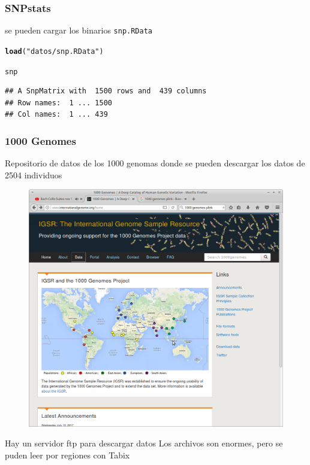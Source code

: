 \documentclass{beamer}\usepackage[]{graphicx}\usepackage[]{color}
\makeatletter
\newcommand{\hlstr}[1]{\textcolor[rgb]{0.192,0.494,0.8}{#1}}%
\newcommand{\hlstd}[1]{\textcolor[rgb]{0.345,0.345,0.345}{#1}}%
\newcommand{\hlkwd}[1]{\textcolor[rgb]{0.737,0.353,0.396}{\textbf{#1}}}%
\newenvironment{kframe}{%
 \def\at@end@of@kframe{}%
 \ifinner\ifhmode%
  \def\at@end@of@kframe{\end{minipage}}%
  \begin{minipage}{\columnwidth}%
 \fi\fi%
 \def\FrameCommand##1{\hskip\@totalleftmargin \hskip-\fboxsep
 \colorbox{shadecolor}{##1}\hskip-\fboxsep
     \hskip-\linewidth \hskip-\@totalleftmargin \hskip\columnwidth}%
 \MakeFramed {\advance\hsize-\width
   \@totalleftmargin\z@ \linewidth\hsize
   \@setminipage}}%
 {\par\unskip\endMakeFramed%
 \at@end@of@kframe}
\newenvironment{knitrout}{}{} %
\makeatother
\begin{document}
\begin{frame}[fragile]
\frametitle{SNPstats}

se pueden cargar los binarios {\tt snp.RData}
\begin{knitrout}\footnotesize
{}\color{fgcolor}\begin{kframe}
\begin{alltt}
\hlkwd{load}\hlstd{(}\hlstr{"datos/snp.RData"}\hlstd{)}
\end{alltt}
\end{kframe}
\end{knitrout}

\begin{knitrout}\footnotesize
{}\color{fgcolor}\begin{kframe}
\begin{alltt}
\hlstd{snp}
\end{alltt}
\begin{verbatim}
## A SnpMatrix with  1500 rows and  439 columns
## Row names:  1 ... 1500 
## Col names:  1 ... 439
\end{verbatim}
\end{kframe}
\end{knitrout}

\end{frame}



\begin{frame}[fragile]
\frametitle{1000 Genomes}
Repositorio de datos de los 1000 genomas donde se pueden descargar los datos de 2504 individuos

\begin{figure}[htbp]
\begin{center}
\includegraphics[width=.6\linewidth]{home1k.png}
\end{center}
\end{figure}
Hay un servidor ftp para descargar datos 
Los archivos son enormes, pero se puden leer por regiones con Tabix
\end{frame}
\end{document}
